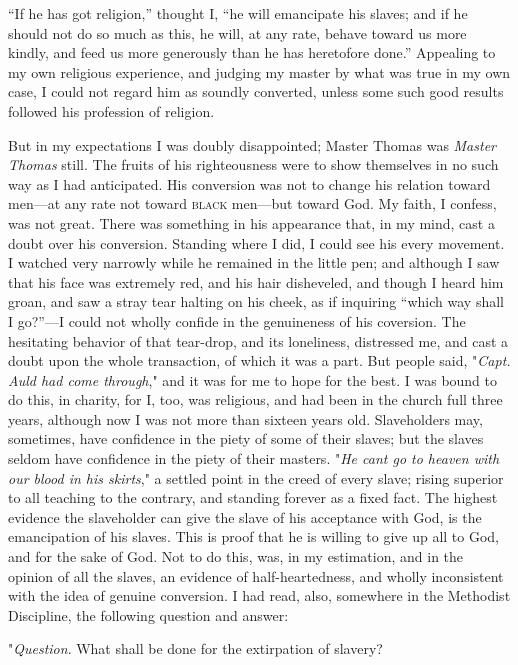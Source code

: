 ``If he has got religion,'' thought I, ``he will emancipate his slaves;
and if he should not do so much as this, he will, at any rate, behave
toward us more kindly, and feed us more generously than he has
heretofore done.'' Appealing to my own religious experience, and judging
my master by what was {\protect\hypertarget{195}{}{}}true in my own
case, I could not regard him as soundly converted, unless some such good
results followed his profession of religion.

But in my expectations I was doubly disappointed; Master Thomas was
\emph{Master Thomas} still. The fruits of his righteousness were to show
themselves in no such way as I had anticipated. His conversion was not
to change his relation toward men---at any rate not toward
\textsc{black} men---but toward God. My faith, I confess, was not great.
There was something in his appearance that, in my mind, cast a doubt
over his conversion. Standing where I did, I could see his every
movement. I watched very narrowly while he remained in the little pen;
and although I saw that his face was extremely red, and his hair
disheveled, and though I heard him groan, and saw a stray tear halting
on his cheek, as if inquiring ``which way shall I go?''---I could not
wholly confide in the genuineness of his {coversion}. The hesitating
behavior of that tear-drop, and its loneliness, distressed me, and cast
a doubt upon the whole transaction, of which it was a part. But people
said, "\emph{Capt. Auld had come through}," and it was for me to hope
for the best. I was bound to do this, in charity, for I, too, was
religious, and had been in the church full three years, although now I
was not more than sixteen years old. Slaveholders may, sometimes, have
confidence in the piety of some of their slaves; but the slaves seldom
have confidence in the piety of their masters. "\emph{He cant go to
heaven with our blood in his skirts}," a settled point in the creed of
every slave; rising superior to all teaching to the contrary, and
standing {\protect\hypertarget{196}{}{}}forever as a fixed fact. The
highest evidence the slaveholder can give the slave of his acceptance
with God, is the emancipation of his slaves. This is proof that he is
willing to give up all to God, and for the sake of God. Not to do this,
was, in my estimation, and in the opinion of all the slaves, an evidence
of half-heartedness, and wholly inconsistent with the idea of genuine
conversion. I had read, also, somewhere in the Methodist Discipline, the
following question and answer:

"\emph{Question}. What shall be done for the extirpation of slavery?

